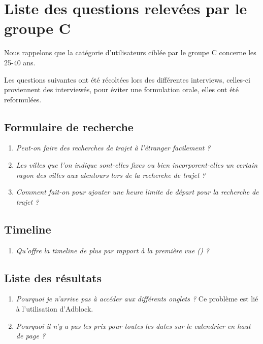 \section{Liste des questions relev\'{e}es par le groupe C}

Nous rappelons que la cat\'{e}gorie d'utilisateurs cibl\'{e}e par le groupe C
concerne les 25-40 ans.


Les questions suivantes ont \'{e}t\'{e} r\'{e}colt\'{e}es lors des diff\'{e}rentes interviews, celles-ci proviennent des interview\'{e}s, pour \'{e}viter une formulation orale, elles ont \'{e}t\'{e} reformul\'{e}es.

\subsection{Formulaire de recherche}

\begin{enumerate}
\item {\em Peut-on faire des recherches de trajet \`{a} l'\'{e}tranger facilement ?}
\item {\em Les villes que l'on indique sont-elles fixes ou bien incorporent-elles un certain rayon des villes aux alentours lors de la recherche de trajet ?}
\item {\em Comment fait-on pour ajouter une heure limite de d\'{e}part pour la recherche de trajet ?}
\end{enumerate}

\subsection{Timeline}
\begin{enumerate}
\item {\em Qu'offre la timeline de plus par rapport \`{a} la premi\`{e}re vue () ?}
\end{enumerate}


\subsection{Liste des r\'{e}sultats}
\begin{enumerate}
\item {\em Pourquoi je n'arrive pas \`{a} acc\'{e}der aux diff\'{e}rents onglets ?} Ce probl\`{e}me est li\'{e} \`{a} l'utilisation d'Adblock.
\item {\em Pourquoi il n'y a pas les prix pour toutes les dates sur le calendrier en haut de page ?}


\end{enumerate}
